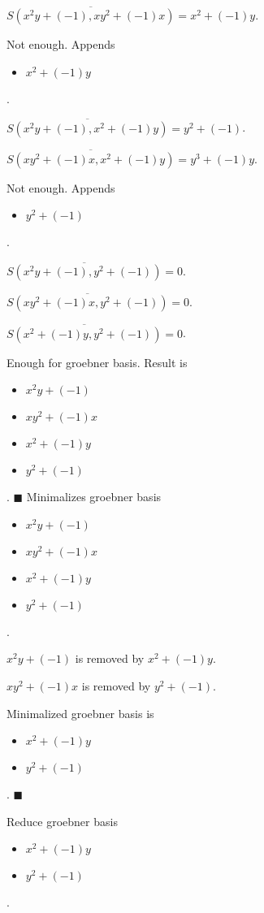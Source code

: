 \documentclass{jsarticle}
\begin{document}
$\overline{S(x^{2}y+(-1), xy^{2}+(-1)x)} = x^{2}+(-1)y$.  

Not enough.  Appends \begin{itemize}
\item $x^{2}+(-1)y$
\end{itemize}  . 


$\overline{S(x^{2}y+(-1), x^{2}+(-1)y)} = y^{2}+(-1)$.  

$\overline{S(xy^{2}+(-1)x, x^{2}+(-1)y)} = y^{3}+(-1)y$.  

Not enough.  Appends \begin{itemize}
\item $y^{2}+(-1)$
\end{itemize}  . 


$\overline{S(x^{2}y+(-1), y^{2}+(-1))} = 0$.  

$\overline{S(xy^{2}+(-1)x, y^{2}+(-1))} = 0$.  

$\overline{S(x^{2}+(-1)y, y^{2}+(-1))} = 0$.  

Enough for groebner basis.  Result is \begin{itemize}
\item $x^{2}y+(-1)$
\item $xy^{2}+(-1)x$
\item $x^{2}+(-1)y$
\item $y^{2}+(-1)$
\end{itemize}  . 
$\blacksquare{}$
Minimalizes groebner basis 
\begin{itemize}
\item $x^{2}y+(-1)$
\item $xy^{2}+(-1)x$
\item $x^{2}+(-1)y$
\item $y^{2}+(-1)$
\end{itemize}  . 


$x^{2}y+(-1)$ is removed by $x^{2}+(-1)y$.  

$xy^{2}+(-1)x$ is removed by $y^{2}+(-1)$.  

Minimalized groebner basis is 
\begin{itemize}
\item $x^{2}+(-1)y$
\item $y^{2}+(-1)$
\end{itemize}  . 
$\blacksquare{}$

Reduce groebner basis 
\begin{itemize}
\item $x^{2}+(-1)y$
\item $y^{2}+(-1)$
\end{itemize}  . 
\end{document}
